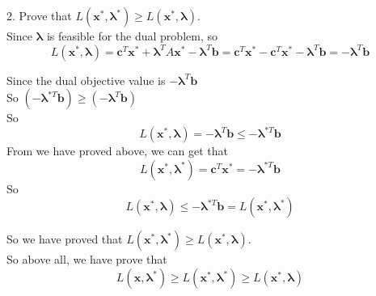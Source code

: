 \documentclass[10pt]{article}
\begin{document}
2. Prove that $L(\bm{x}^*, \bm{\lambda}^*) \geq L(\bm{x}^*, \bm{\lambda})$.\\
Since $\bm{\lambda}$ is feasible for the dual problem, so
$$L(\bm{x}^*,\bm{\lambda})=\bm{c}^T\bm{x}^* + \bm{\lambda}^TA\bm{x}^* - \bm{\lambda}^T\bm{b} = \bm{c}^T\bm{x}^* - \bm{c}^T\bm{x}^* - \bm{\lambda}^T\bm{b}=-\bm{\lambda}^T\bm{b}$$

Since the dual objective value is $-\bm{\lambda}^T\bm{b}$\\
So $(-\bm{\lambda}^{*T}\bm{b})\geq (-\bm{\lambda}^T\bm{b})$\\
So
$$L(\bm{x}^*,\bm{\lambda})=-\bm{\lambda}^T\bm{b}\leq -\bm{\lambda}^{*T}\bm{b}$$
From we have proved above, we can get that
$$L(\bm{x}^*, \bm{\lambda}^*)=\bm{c}^T\bm{x}^*=-\bm{\lambda}^{*T}\bm{b}$$
So
$$L(\bm{x}^*,\bm{\lambda})\leq -\bm{\lambda}^{*T}\bm{b}=L(\bm{x}^*, \bm{\lambda}^*)$$

So we have proved that $L(\bm{x}^*, \bm{\lambda}^*) \geq L(\bm{x}^*, \bm{\lambda})$.\\

So above all, we have prove that 
$$L(\bm{x}, \bm{\lambda}^*) \geq L(\bm{x}^*, \bm{\lambda}^*) \geq L(\bm{x}^*, \bm{\lambda})$$

\newpage

\end{document}
